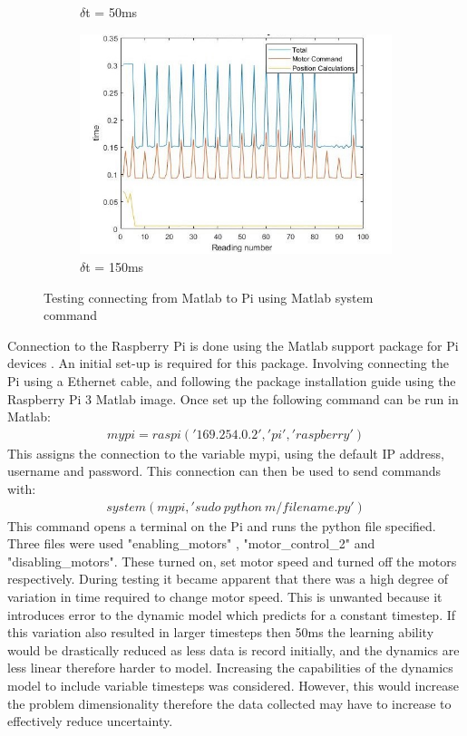 \documentclass[twoside,twocolumn,12pt]{article}
\begin{document}
\begin{figure}[t]
\begin{subfigure}[t]{0.325\textwidth}
    \caption{$\delta$t = 50ms}
  \label{fig:pi50}
  \end{subfigure}
  \begin{subfigure}[t]{0.325\textwidth}
    \includegraphics[width=\linewidth]{150ms_pi}
    \caption{$\delta$t = 150ms}
  \label{fig:pi150}
  \end{subfigure}
  \caption{Testing connecting from Matlab to Pi using Matlab system command}
  \label{fig:pi}
\end{figure}
Connection to the Raspberry Pi is done using the Matlab support package for Pi devices \cite{pi}. An initial set-up is required for this package. Involving connecting the Pi using a Ethernet cable, and following the package installation guide using the Raspberry Pi 3 Matlab image. Once set up the following command can be run in Matlab:
\begin{gather}
mypi = raspi('169.254.0.2', 'pi', 'raspberry') \nonumber
\end{gather}
This assigns the connection to the variable mypi, using the default IP address, username and password. This connection can then be used to send commands with:
\begin{gather}
system(mypi, 'sudo \: python \: m/filename.py') \nonumber
\end{gather}
This command opens a terminal on the Pi and runs the python file specified. Three files were used \cite{motorcmd} "enabling\_motors" , "motor\_control\_2" and "disabling\_motors". These turned on, set motor speed and turned off the motors respectively.
\newline
During testing it became apparent that there was a high degree of variation in time required to change motor speed. This is unwanted because it introduces error to the dynamic model which predicts for a constant timestep. If this variation also resulted in larger timesteps then 50ms the learning ability would be drastically reduced as less data is record initially, and the dynamics are less linear therefore harder to model. Increasing the capabilities of the dynamics model to include variable timesteps was considered. However, this would increase the problem dimensionality therefore the data collected may have to increase to effectively reduce uncertainty.
\end{document}

